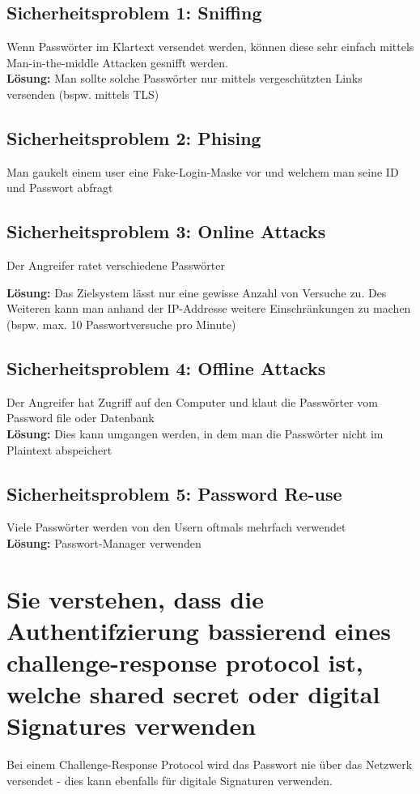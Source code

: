 \documentclass{report}
\theoremstyle{definition}
\theoremstyle{example}
\begin{document}
	\subsection{Sicherheitsproblem 1: Sniffing}
Wenn Passwörter im Klartext versendet werden, können diese sehr einfach mittels Man-in-the-middle Attacken gesnifft werden. \\


\textbf{Lösung:} Man sollte solche Passwörter nur mittels vergeschützten Links versenden (bspw. mittels TLS)

	\subsection{Sicherheitsproblem 2: Phising}
Man gaukelt einem user eine Fake-Login-Maske vor und welchem man seine ID und Passwort abfragt

	\subsection{Sicherheitsproblem 3: Online Attacks}
Der Angreifer ratet verschiedene Passwörter

\textbf{Lösung:} Das Zielsystem lässt nur eine gewisse Anzahl von Versuche zu. Des Weiteren kann man anhand der IP-Addresse weitere Einschränkungen zu machen (bspw. max. 10 Passwortversuche pro Minute) 

	\subsection{Sicherheitsproblem 4: Offline Attacks}
Der Angreifer hat Zugriff auf den Computer und klaut die Passwörter vom Password file oder Datenbank\\
\textbf{Lösung:} Dies kann umgangen werden, in dem man die Passwörter nicht im Plaintext abspeichert

	\subsection{Sicherheitsproblem 5: Password Re-use}
Viele Passwörter werden von den Usern oftmals mehrfach verwendet \\
\textbf{Lösung:} Passwort-Manager verwenden


\section{Sie verstehen, dass die Authentifzierung bassierend eines challenge-response protocol ist, welche shared secret oder digital Signatures verwenden}
Bei einem Challenge-Response Protocol wird das Passwort nie über das Netzwerk versendet - dies kann ebenfalls für digitale Signaturen verwenden.\\
\end{document}
